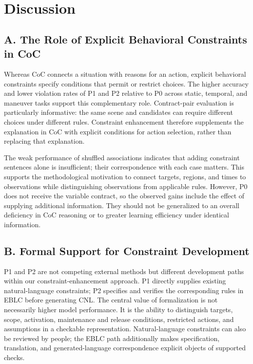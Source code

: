 \documentclass[11pt,a4paper]{article}
\begin{document}
\section*{Discussion}

\subsection*{A. The Role of Explicit Behavioral Constraints in CoC}

Whereas CoC connects a situation with reasons for an action, explicit behavioral constraints specify conditions that permit or restrict choices. The higher accuracy and lower violation rates of P1 and P2 relative to P0 across static, temporal, and maneuver tasks support this complementary role. Contract-pair evaluation is particularly informative: the same scene and candidates can require different choices under different rules. Constraint enhancement therefore supplements the explanation in CoC with explicit conditions for action selection, rather than replacing that explanation.\par

The weak performance of shuffled associations indicates that adding constraint sentences alone is insufficient; their correspondence with each case matters. This supports the methodological motivation to connect targets, regions, and times to observations while distinguishing observations from applicable rules. However, P0 does not receive the variable contract, so the observed gains include the effect of supplying additional information. They should not be generalized to an overall deficiency in CoC reasoning or to greater learning efficiency under identical information.\par

\subsection*{B. Formal Support for Constraint Development}

P1 and P2 are not competing external methods but different development paths within our constraint-enhancement approach. P1 directly supplies existing natural-language constraints; P2 specifies and verifies the corresponding rules in EBLC before generating CNL. The central value of formalization is not necessarily higher model performance. It is the ability to distinguish targets, scope, activation, maintenance and release conditions, restricted actions, and assumptions in a checkable representation. Natural-language constraints can also be reviewed by people; the EBLC path additionally makes specification, translation, and generated-language correspondence explicit objects of supported checks.\par
\end{document}
